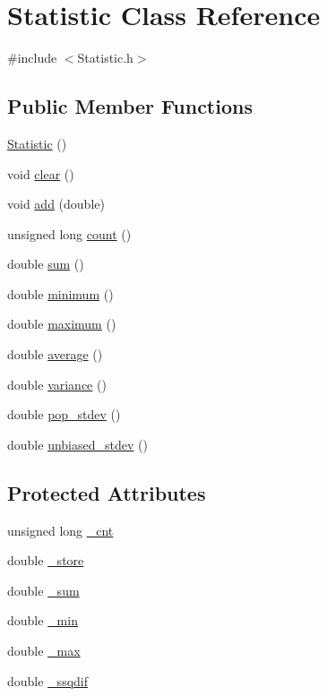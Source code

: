 \hypertarget{class_statistic}{\section{Statistic Class Reference}
\label{class_statistic}
}


{\ttfamily \#include $<$Statistic.\+h$>$}

\subsection*{Public Member Functions}
\begin{DoxyCompactItemize}
\item 
\hyperlink{class_statistic_a00637756290a7a4c8444e7076c135466}{Statistic} ()
\item 
void \hyperlink{class_statistic_aede7bb9d06227b787b241f73693995f6}{clear} ()
\item 
void \hyperlink{class_statistic_afe2e8b12bc64ef90f37c9569fa7c6a8b}{add} (double)
\item 
unsigned long \hyperlink{class_statistic_a1057b4e2152fd136cf67fb4a9c21a205}{count} ()
\item 
double \hyperlink{class_statistic_aa99176666950335e98eab4051a31ded3}{sum} ()
\item 
double \hyperlink{class_statistic_a3a9fcf73d25f8b18f0dc97a2af0efd93}{minimum} ()
\item 
double \hyperlink{class_statistic_a4766160384e00ae56e58bccf5ff225ad}{maximum} ()
\item 
double \hyperlink{class_statistic_acf01e9162537f179e164316557a44e6c}{average} ()
\item 
double \hyperlink{class_statistic_a5845061b58e149e67b6cf9ec39c31463}{variance} ()
\item 
double \hyperlink{class_statistic_acde3ec9a8cdf2b258b23e7f52f402b17}{pop\+\_\+stdev} ()
\item 
double \hyperlink{class_statistic_a042d4f5b3e6532d88a65e004621eed8c}{unbiased\+\_\+stdev} ()
\end{DoxyCompactItemize}
\subsection*{Protected Attributes}
\begin{DoxyCompactItemize}
\item 
unsigned long \hyperlink{class_statistic_a7fef0bb20a000cbf730effea59e27981}{\+\_\+cnt}
\item 
double \hyperlink{class_statistic_a3c91ba1c8c8f0d20c803e3970d0a2a7e}{\+\_\+store}
\item 
double \hyperlink{class_statistic_aef8ea05f388c51bed8e7261059c84c7a}{\+\_\+sum}
\item 
double \hyperlink{class_statistic_a88f044d1ba01dfa1a30094ada14beb7b}{\+\_\+min}
\item 
double \hyperlink{class_statistic_a7239cdbbfe42ffa0a4bc3957f00ce578}{\+\_\+max}
\item 
double \hyperlink{class_statistic_a9620f6ca72b93c559fbe77235d1f60a8}{\+\_\+ssqdif}
\end{DoxyCompactItemize}


